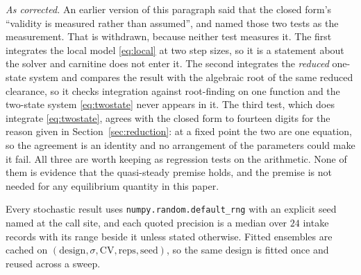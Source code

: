 \emph{As corrected.} An earlier version of this paragraph said that the closed form's
``validity is measured rather than assumed'', and named those two tests as the measurement.
That is withdrawn, because neither test measures it. The first integrates the local model
\eqref{eq:local} at two step sizes, so it is a statement about the solver and carnitine does
not enter it. The second integrates the \emph{reduced} one-state system and compares the
result with the algebraic root of the same reduced clearance, so it checks integration
against root-finding on one function and the two-state system \eqref{eq:twostate} never
appears in it. The third test, which does integrate \eqref{eq:twostate}, agrees with the
closed form to fourteen digits for the reason given in Section~\ref{sec:reduction}: at a
fixed point the two are one equation, so the agreement is an identity and no arrangement of
the parameters could make it fail. All three are worth keeping as regression tests on the
arithmetic. None of them is evidence that the quasi-steady premise holds, and the premise is
not needed for any equilibrium quantity in this paper.

Every stochastic result uses \texttt{numpy.random.default\_rng} with an explicit seed named
at the call site, and each quoted precision is a median over $24$ intake records with its
range beside it unless stated otherwise. Fitted ensembles are cached on
$(\text{design}, \sigma, \mathrm{CV}, \text{reps}, \text{seed})$, so the same design is
fitted once and reused across a sweep.
